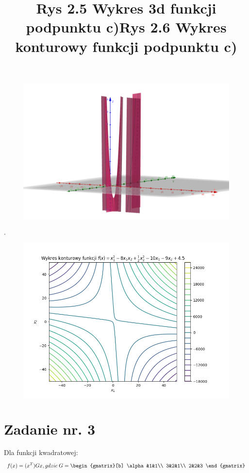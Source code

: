 \documentclass{article}
\begin{document}
\begin{figure}[h]
  \includegraphics[scale=0.4]{Zadanie2c-wykres.png}
  \title{Rys 2.5 Wykres 3d funkcji podpunktu c)}
  \centering
\end{figure}
\newpage
.
\begin{figure}[h]
  \includegraphics[scale=0.5]{Zad2c.png}
  \title{Rys 2.6 Wykres konturowy funkcji podpunktu c)}
  \centering
\end{figure}
\newpage
\section{Zadanie nr. 3}
Dla funkcji kwadratowej:\\
\begin{equation}
  f(x) =   (x^T)Gx, gdzie \: G = \begin{gmatrix}[b]
    \alpha&1&1\\
    3&2&1\\
    2&2&3
  \end{gmatrix}
\end{equation}
\end{document}
